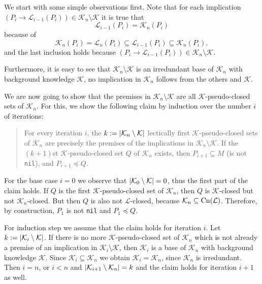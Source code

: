 \begin{Proof}
  We start with some simple observations first.  Note that for each implication $(P_{i}
  \to \mathcal{L}_{i-1}(P_{i})) \in \mathcal{K}_{n} \setminus \mathcal{K}$ it is true that
  \begin{equation}
    \label{eq:38}
    \mathcal{L}_{i-1}(P_{i}) = \mathcal{K}_{n}(P_{i})
  \end{equation}
  because of
  \begin{equation*}
    \mathcal{K}_{n}(P_{i}) = \mathcal{L}_{n}(P_{i}) \subseteq
    \mathcal{L}_{i-1}(P_{i}) \subseteq \mathcal{K}_{n}(P_{i}),
  \end{equation*}
  and the last inclusion holds because $(P_{i} \to \mathcal{L}_{i-1}(P_{i})) \in
  \mathcal{K}_{n} \setminus \mathcal{K}$.

  Furthermore, it is easy to see that $\mathcal{K}_{n} \setminus \mathcal{K}$ is an
  irredundant base of $\mathcal{K}_{n}$ with background knowledge $\mathcal{K}$, \ie no
  implication in $\mathcal{K}_{n}$ follows from the others and $\mathcal{K}$.

  We are now going to show that the premises in $\mathcal{K}_{n} \setminus \mathcal{K}$
  are all $\mathcal{K}$-pseudo-closed sets of $\mathcal{K}_{n}$.  For this, we show the
  following claim by induction over the number $i$ of iterations:
  \begin{quote}
    For every iteration $i$, the $k := \lvert \mathcal{K}_{n} \setminus \mathcal{K} \rvert$
    lectically first $\mathcal{K}$-pseudo-closed sets of $\mathcal{K}_{n}$ are precisely
    the premises of the implications in $\mathcal{K}_{n} \setminus \mathcal{K}$.  If the
    $(k+1)$st $\mathcal{K}$-pseudo-closed set $Q$ of $\mathcal{K}_{n}$ exists, then
    $P_{i+1} \subseteq M$ (\ie is not \lstinline{nil}), and $P_{i+1} \preceq Q$.
  \end{quote}

  For the base case $i = 0$ we observe that $\lvert \mathcal{K}_{0} \setminus \mathcal{K} \rvert
  = 0$, thus the first part of the claim holds.  If $Q$ is the first
  $\mathcal{K}$-pseudo-closed set of $\mathcal{K}_{n}$, then $Q$ is $\mathcal{K}$-closed
  but not $\mathcal{K}_{n}$-closed.  But then $Q$ is also not $\mathcal{L}$-closed,
  because $\mathcal{K}_{n} \subseteq \operatorname{Cn}(\mathcal{L})$.  Therefore, by construction,
  $P_{1}$ is not \lstinline{nil} and $P_{1} \preceq Q$.

  For induction step we assume that the claim holds for iteration $i$.  Let $k := \lvert
    \mathcal{K}_{i} \setminus \mathcal{K} \rvert$.  If there is no more
  $\mathcal{K}$-pseudo-closed set of $\mathcal{K}_{n}$ which is not already a premise of
  an implication in $\mathcal{K}_{i} \setminus \mathcal{K}$, then $\mathcal{K}_{i}$ is a
  base of $\mathcal{K}_{n}$ with background knowledge $\mathcal{K}$.  Since
  $\mathcal{K}_{i} \subseteq \mathcal{K}_{n}$ we obtain $\mathcal{K}_{i} =
  \mathcal{K}_{n}$, since $\mathcal{K}_{n}$ is irredundant.  Then $i = n$, or $i < n$ and
  $\lvert \mathcal{K}_{i+1} \setminus \mathcal{K}_{n} \rvert = k$ and the claim holds for
  iteration $i+1$ as well.


\end{Proof}
